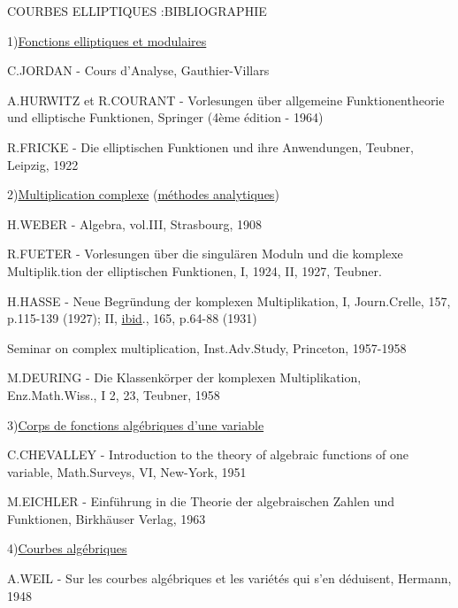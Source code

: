 \begin{center}
COURBES ELLIPTIQUES :\quad BIBLIOGRAPHIE
\end{center}

1)\quad \uline{Fonctions elliptiques et modulaires}

C.JORDAN - Cours d'Analyse, Gauthier-Villars

A.HURWITZ et R.COURANT - Vorlesungen über allgemeine Funktionentheorie und elliptische Funktionen, Springer (4ème édition - 1964)

R.FRICKE - Die elliptischen Funktionen und ihre Anwendungen, Teubner, Leipzig, 1922

2)\quad \uline{Multiplication complexe} (\uline{méthodes analytiques})

H.WEBER - Algebra, vol.III, Strasbourg, 1908

R.FUETER - Vorlesungen über die singulären Moduln und die komplexe Multiplik.tion der elliptischen Funktionen, I, 1924, II, 1927, Teubner.

H.HASSE - Neue Begründung der komplexen Multiplikation, I, Journ.Crelle, 157, p.115-139 (1927); II, \uline{ibid}., 165, p.64-88 (1931)

Seminar on complex multiplication, Inst.Adv.Study, Princeton, 1957-1958

M.DEURING - Die Klassenkörper der komplexen Multiplikation, Enz.Math.Wiss., I 2, 23, Teubner, 1958

3)\quad \uline{Corps de fonctions algébriques d'une variable}

C.CHEVALLEY - Introduction to the theory of algebraic functions of one variable, Math.Surveys, VI, New-York, 1951

M.EICHLER - Einführung in die Theorie der algebraischen Zahlen und Funktionen, Birkhäuser Verlag, 1963
\clearpage
{}
\reversemarginpar
{}
\normalmarginpar
{}

4)\quad \uline{Courbes algébriques}

\reversemarginpar
{}
A.WEIL - Sur \makebox[0pt][l]{\deleted{\unsure{-|=}}}les courbes algébriques et les variétés qui s'en déduisent, Hermann, 1948

